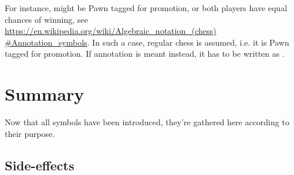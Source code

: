 For instance,  might be Pawn tagged for promotion, or both players have equal
chances of winning, see \newline
\href{https://en.wikipedia.org/wiki/Algebraic\_notation\_(chess)#Annotation\_symbols}
{https://en.wikipedia.org/wiki/Algebraic\_notation\_(chess) \newline
\#Annotation\_symbols}. In such a case, regular chess  is assumed, i.e. it
is Pawn tagged for promotion. If annotation is meant instead, it has to be written as
.

\clearpage %

\section*{Summary}
\label{sec:Appendix/Summary}

Now that all symbols have been introduced, they're gathered here according to their purpose.

\subsection*{Side-effects}
\label{sec:Appendix/Summary/Side-effects}

